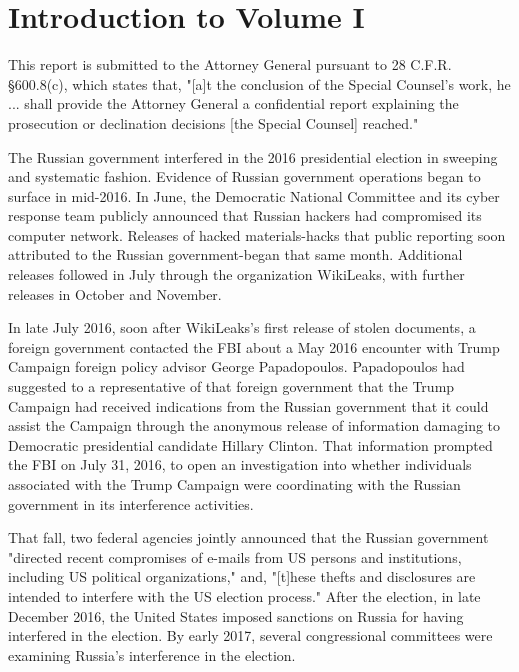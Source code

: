 \documentclass{article}
\begin{document}
\tableofcontents
\newpage
{}

\section{Introduction to Volume I}

This report is submitted to the Attorney General pursuant to 28 C.F.R. \S 600.8(c), which states that, "[a]t the conclusion of the Special Counsel's work, he ... shall provide the Attorney General a confidential report explaining the prosecution or declination decisions [the Special Counsel] reached."

The Russian government interfered in the 2016 presidential election in sweeping and systematic fashion.
Evidence of Russian government operations began to surface in mid-2016.
In June, the Democratic National Committee and its cyber response team publicly announced that Russian hackers had compromised its computer network. Releases of hacked materials-hacks that public reporting soon attributed to the Russian government-began that same month.
Additional releases followed in July through the organization WikiLeaks, with further releases in October and November.

In late July 2016, soon after WikiLeaks's first release of stolen documents, a foreign government contacted the FBI about a May 2016 encounter with Trump Campaign foreign policy advisor George Papadopoulos.
Papadopoulos had suggested to a representative of that foreign government that the Trump Campaign had received indications from the Russian government that it could assist the Campaign through the anonymous release of information damaging to Democratic presidential candidate Hillary Clinton.
That information prompted the FBI on July 31, 2016, to open an investigation into whether individuals associated with the Trump Campaign were coordinating with the Russian government in its interference activities.

That fall, two federal agencies jointly announced that the Russian government "directed recent compromises of e-mails from US persons and institutions, including US political organizations," and, "[t]hese thefts and disclosures are intended to interfere with the US election process."
After the election, in late December 2016, the United States imposed sanctions on Russia for having interfered in the election. By early 2017, several congressional committees were examining Russia's interference in the election.
\end{document}
